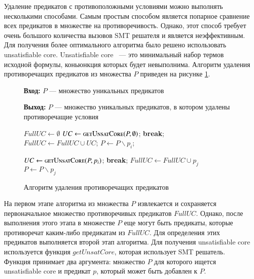 Удаление предикатов с противоположными условиями можно выполнять несколькими способами. Самым простым способом является попарное сравнение всех предикатов в множестве на противоречивость. Однако, этот способ требует очень большого количества вызовов SMT решателя и является неэффективным. Для получения более оптимального алгоритма было решено использовать unsatisfiable core. Unsatisfiable core~\cite{unsatcore} --- это минимальный набор термов исходной формулы, коньюнкция которых будет невыполнима.  Алгоритм удаления противоречащих предикатов из  множества $P$ приведен на рисунке \ref{image:deletingAlgoritm}.
\begin{figure}[h!]
\textbf{Вход:} $P$ --- множество уникальных предикатов

\textbf{Выход:} $P$ --- множество уникальных предикатов, в котором удалены противоречащие условия

\begin{algorithmic}[1]
\State $FullUC \leftarrow \emptyset$
	\State $UC \leftarrow \Call{getUnsatCore}{P, \emptyset}$;
		\State \textbf{break};
	\EndIf
	\State $FullUC \leftarrow FullUC \cup UC$;
		\State $P \leftarrow P \backslash p_i$;
	\EndFor
\EndWhile

		\State $UC \leftarrow \Call{getUnsatCore}{P, p_i}$;
			\State \textbf{break};
		\EndIf
				\State $FullUC \leftarrow FullUC \cup p_j$
				\State $P \leftarrow P \backslash p_j$
			\EndIf
		\EndFor
	\EndFor
\EndWhile
\end{algorithmic}
\caption{Алгоритм удаления противоречащих предикатов}
\label{image:deletingAlgoritm}
\end{figure}

На первом этапе алгоритма из множества $P$ извлекается и сохраняется первоначальное множество противоречивых предикатов $FullUC$. Однако, после выполнения этого этапа в множестве $P$ еще могут быть предикаты, которые противоречат каким-либо предикатам из $FullUC$. Для определения этих предикатов выполняется второй этап алгоритма. Для получения unsatisfiable core используется функция $getUnsatCore$, которая использует SMT решатель. Функция принимает два аргумента: множество $P$ для которого ищется unsatisfiable core и предикат $p$, который может быть добавлен к $P$.

